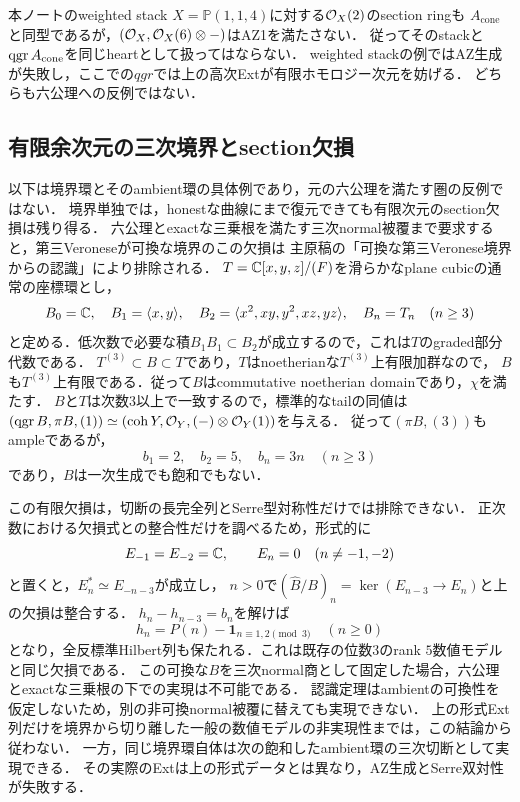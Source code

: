 \documentclass[11pt,a4paper]{ltjsarticle}
\begin{document}
本ノートのweighted stack $X=\mathbb P(1,1,4)$に対する$\mathcal O_X(2)$のsection ringも
$A_{\mathrm{cone}}$と同型であるが，$(\mathcal O_X,\mathcal O_X(6)\otimes-)$はAZ1を満たさない．
従ってそのstackと$\operatorname{qgr} A_{\mathrm{cone}}$を同じheartとして扱ってはならない．
weighted stackの例ではAZ生成が失敗し，ここでの$qgr$では上の高次Extが有限ホモロジー次元を妨げる．
どちらも六公理への反例ではない．

\subsection{有限余次元の三次境界とsection欠損}\label{subsec:cubic-finite-defect}

以下は境界環とそのambient環の具体例であり，元の六公理を満たす圏の反例ではない．
境界単独では，honestな曲線にまで復元できても有限次元のsection欠損は残り得る．
六公理とexactな三乗根を満たす三次normal被覆まで要求すると，第三Veroneseが可換な境界のこの欠損は
主原稿の「可換な第三Veronese境界からの認識」により排除される．
$T=\mathbb C[x,y,z]/(F)$を滑らかなplane cubicの通常の座標環とし，
\[
 B_0=\mathbb C,\quad B_1=\langle x,y\rangle,\quad
 B_2=\langle x^2,xy,y^2,xz,yz\rangle,\quad
 B_n=T_n\quad(n\geq3)
\]
と定める．低次数で必要な積$B_1B_1\subset B_2$が成立するので，これは$T$のgraded部分代数である．
$T^{(3)}\subset B\subset T$であり，$T$はnoetherianな$T^{(3)}$上有限加群なので，
$B$も$T^{(3)}$上有限である．従って$B$はcommutative noetherian domainであり，$\chi$を満たす．
$B$と$T$は次数$3$以上で一致するので，標準的なtailの同値は
$(\operatorname{qgr} B,\pi B,(1))\simeq(\operatorname{coh} Y,\mathcal O_Y,(-)\otimes\mathcal O_Y(1))$を与える．
従って$(\pi B,(3))$もampleであるが，
\[
 b_1=2,\quad b_2=5,\quad b_n=3n\quad(n\geq3)
\]
であり，$B$は一次生成でも飽和でもない．

この有限欠損は，切断の長完全列とSerre型対称性だけでは排除できない．
正次数における欠損式との整合性だけを調べるため，形式的に
\[
 E_{-1}=E_{-2}=\mathbb C,\qquad E_n=0\quad(n\ne-1,-2)
\]
と置くと，$E_n^*\simeq E_{-n-3}$が成立し，
$n>0$で$(\widehat B/B)_n=\ker(E_{n-3}\to E_n)$と上の欠損は整合する．
$h_n-h_{n-3}=b_n$を解けば
\[
 h_n=P(n)-\mathbf1_{n\equiv1,2\pmod3}\quad(n\geq0)
\]
となり，全反標準Hilbert列も保たれる．これは既存の位数$3$のrank $5$数値モデルと同じ欠損である．
この可換な$B$を三次normal商として固定した場合，六公理とexactな三乗根の下での実現は不可能である．
認識定理はambientの可換性を仮定しないため，別の非可換normal被覆に替えても実現できない．
上の形式Ext列だけを境界から切り離した一般の数値モデルの非実現性までは，この結論から従わない．
一方，同じ境界環自体は次の飽和したambient環の三次切断として実現できる．
その実際のExtは上の形式データとは異なり，AZ生成とSerre双対性が失敗する．
\end{document}
